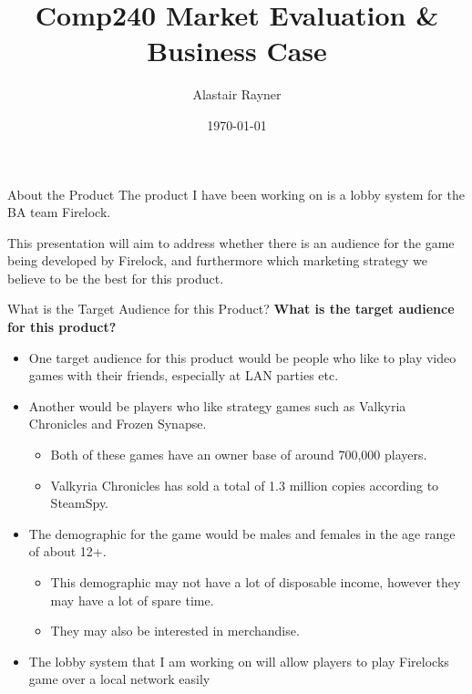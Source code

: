 \documentclass{beamer}
\title{Comp240 Market Evaluation \& Business Case}
\author{Alastair Rayner}
\date{\today}
\begin{document}
\maketitle


\begin{frame}{About the Product}
	The product I have been working on is a lobby system for the BA team Firelock. \pause
	
	This presentation will aim to address whether there is an audience for the game being developed by Firelock, and furthermore which marketing strategy we believe to be the best for this product. \pause
\end{frame}


\begin{frame}{What is the Target Audience for this Product?}		
	\textbf{What is the target audience for this product?} \pause
		\begin{itemize}
			\item One target audience for this product would be people who like to play video games with their friends, especially at LAN parties etc. \pause
			\item Another would be players who like strategy games such as Valkyria Chronicles and Frozen Synapse. \pause
			
				\begin{itemize}
					\item Both of these games have an owner base of around 700,000 players. \pause
					\item Valkyria Chronicles has sold a total of 1.3 million copies according to SteamSpy. \pause
				\end{itemize}	
			\item The demographic for the game would be males and females in the age range of about 12+.  \pause
				\begin{itemize}
					\item This demographic may not have a lot of disposable income, however they may have a lot of spare time. \pause
					\item They may also be interested in merchandise. \pause
				\end{itemize}
			\item The lobby system that I am working on will allow players to play Firelocks game over a local network easily \pause 	
		\end{itemize}
\end{frame}
\end{document}
